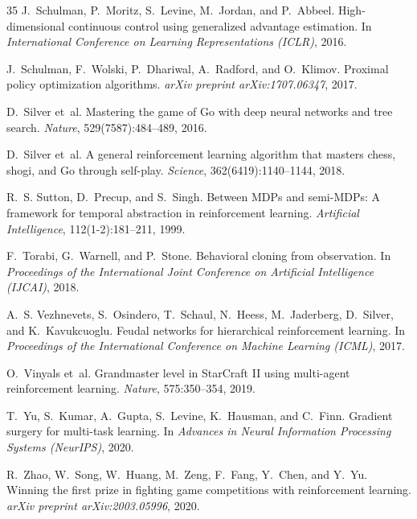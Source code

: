 \documentclass[11pt,a4paper]{article}
\begin{document}
\begin{thebibliography}{35}
J.~Schulman, P.~Moritz, S.~Levine, M.~Jordan, and P.~Abbeel.
\newblock High-dimensional continuous control using generalized advantage estimation.
\newblock In \emph{International Conference on Learning Representations (ICLR)}, 2016.

J.~Schulman, F.~Wolski, P.~Dhariwal, A.~Radford, and O.~Klimov.
\newblock Proximal policy optimization algorithms.
\newblock \emph{arXiv preprint arXiv:1707.06347}, 2017.

D.~Silver et~al.
\newblock Mastering the game of Go with deep neural networks and tree search.
\newblock \emph{Nature}, 529(7587):484--489, 2016.

D.~Silver et~al.
\newblock A general reinforcement learning algorithm that masters chess, shogi, and Go through self-play.
\newblock \emph{Science}, 362(6419):1140--1144, 2018.

R.~S. Sutton, D.~Precup, and S.~Singh.
\newblock Between MDPs and semi-MDPs: A framework for temporal abstraction in reinforcement learning.
\newblock \emph{Artificial Intelligence}, 112(1-2):181--211, 1999.

F.~Torabi, G.~Warnell, and P.~Stone.
\newblock Behavioral cloning from observation.
\newblock In \emph{Proceedings of the International Joint Conference on Artificial Intelligence (IJCAI)}, 2018.

A.~S. Vezhnevets, S.~Osindero, T.~Schaul, N.~Heess, M.~Jaderberg, D.~Silver, and K.~Kavukcuoglu.
\newblock Feudal networks for hierarchical reinforcement learning.
\newblock In \emph{Proceedings of the International Conference on Machine Learning (ICML)}, 2017.

O.~Vinyals et~al.
\newblock Grandmaster level in StarCraft II using multi-agent reinforcement learning.
\newblock \emph{Nature}, 575:350--354, 2019.

T.~Yu, S.~Kumar, A.~Gupta, S.~Levine, K.~Hausman, and C.~Finn.
\newblock Gradient surgery for multi-task learning.
\newblock In \emph{Advances in Neural Information Processing Systems (NeurIPS)}, 2020.

R.~Zhao, W.~Song, W.~Huang, M.~Zeng, F.~Fang, Y.~Chen, and Y.~Yu.
\newblock Winning the first prize in fighting game competitions with reinforcement learning.
\newblock \emph{arXiv preprint arXiv:2003.05996}, 2020.

\end{thebibliography}
\end{document}
